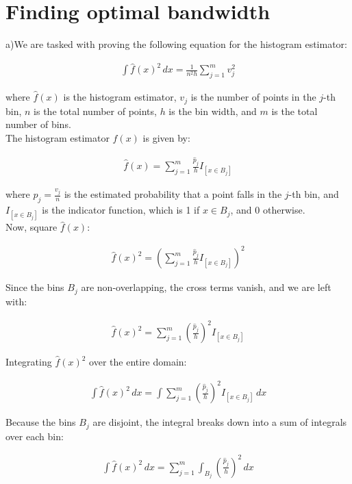 \section{Finding optimal bandwidth}

a)We are tasked with proving the following equation for the histogram estimator:

\begin{align}
\int \hat{f}(x)^2 \, dx = \frac{1}{n^2 h} \sum_{j=1}^{m} v_j^2
\end{align}

where \( \hat{f}(x) \) is the histogram estimator, \( v_j \) is the number of points in the \( j \)-th bin, \( n \) is the total number of points, \( h \) is the bin width, and \( m \) is the total number of bins.
\\

The histogram estimator \( \hat{f}(x) \) is given by:

\begin{align}
\hat{f}(x) = \sum_{j=1}^{m} \frac{\hat{p}_j}{h} I_{[x \in B_j]}
\end{align}

where \( \hat{p}_j = \frac{v_j}{n} \) is the estimated probability that a point falls in the \( j \)-th bin, and \( I_{[x \in B_j]} \) is the indicator function, which is 1 if \( x \in B_j \), and 0 otherwise.
\\
Now, square \( \hat{f}(x) \):

\begin{align}
\hat{f}(x)^2 = \left( \sum_{j=1}^{m} \frac{\hat{p}_j}{h} I_{[x \in B_j]} \right)^2
\end{align}

Since the bins \( B_j \) are non-overlapping, the cross terms vanish, and we are left with:

\begin{align}
\hat{f}(x)^2 = \sum_{j=1}^{m} \left( \frac{\hat{p}_j}{h} \right)^2 I_{[x \in B_j]}
\end{align}


Integrating \( \hat{f}(x)^2 \) over the entire domain:

\begin{align}
\int \hat{f}(x)^2 \, dx = \int \sum_{j=1}^{m} \left( \frac{\hat{p}_j}{h} \right)^2 I_{[x \in B_j]} \, dx
\end{align}

Because the bins \( B_j \) are disjoint, the integral breaks down into a sum of integrals over each bin:

\begin{align}
\int \hat{f}(x)^2 \, dx = \sum_{j=1}^{m} \int_{B_j} \left( \frac{\hat{p}_j}{h} \right)^2 \, dx
\end{align}

